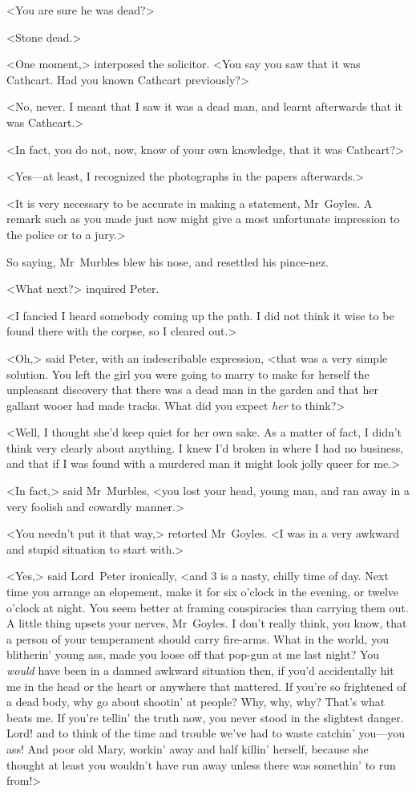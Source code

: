 <You are sure he was dead?>

<Stone dead.>

<One moment,> interposed the solicitor. <You say you saw that it was Cathcart. Had you known Cathcart previously?>

<No, never. I meant that I saw it was a dead man, and learnt afterwards that it was Cathcart.>

<In fact, you do not, now, know of your own knowledge, that it was Cathcart?>

<Yes—at least, I recognized the photographs in the papers afterwards.>

<It is very necessary to be accurate in making a statement, Mr~Goyles.  A remark such as you made just now might give a most unfortunate impression to the police or to a jury.>

So saying, Mr~Murbles blew his nose, and resettled his pince-nez.

<What next?> inquired Peter.

<I fancied I heard somebody coming up the path. I did not think it wise to be found there with the corpse, so I cleared out.>

<Oh,> said Peter, with an indescribable expression, <that was a very simple solution. You left the girl you were going to marry to make for herself the unpleasant discovery that there was a dead man in the garden and that her gallant wooer had made tracks. What did you expect \emph{her} to think?>

<Well, I thought she'd keep quiet for her own sake. As a matter of fact, I didn't think very clearly about anything. I knew I'd broken in where I had no business, and that if I was found with a murdered man it might look jolly queer for me.>

<In fact,> said Mr~Murbles, <you lost your head, young man, and ran away in a very foolish and cowardly manner.>

<You needn't put it that way,> retorted Mr~Goyles. <I was in a very awkward and stupid situation to start with.>

<Yes,> said Lord~Peter ironically, <and 3  is a nasty, chilly time of day. Next time you arrange an elopement, make it for six o'clock in the evening, or twelve o'clock at night. You seem better at framing conspiracies than carrying them out. A little thing upsets your nerves, Mr~Goyles. I don't really think, you know, that a person of your temperament should carry fire-arms. What in the world, you blitherin' young ass, made you loose off that pop-gun at me last night? You \emph{would} have been in a damned awkward situation then, if you'd accidentally hit me in the head or the heart or anywhere that mattered. If you're so frightened of a dead body, why go about shootin' at people? Why, why, why? That's what beats me. If you're tellin' the truth now, you never stood in the slightest danger. Lord! and to think of the time and trouble we've had to waste catchin' you—you ass! And poor old Mary, workin' away and half killin' herself, because she thought at least you wouldn't have run away unless there was somethin' to run from!>

